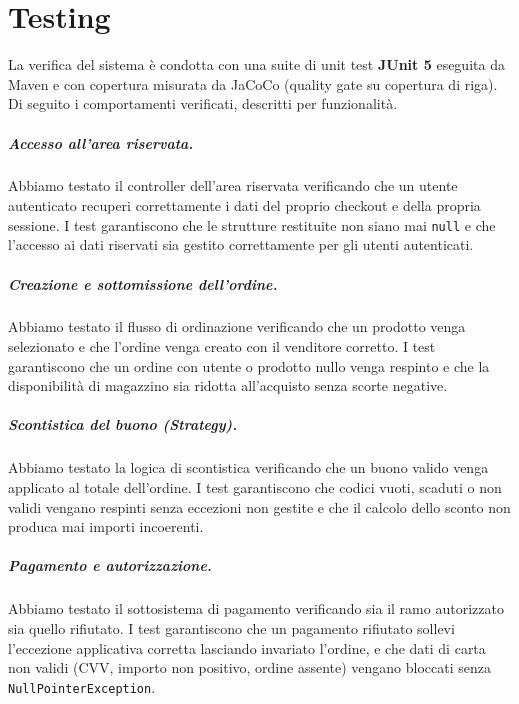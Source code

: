 \chapter{Testing}
\label{cap:testing}

La verifica del sistema è condotta con una suite di unit test \textbf{JUnit 5}
eseguita da Maven e con copertura misurata da JaCoCo (quality gate su copertura
di riga). Di seguito i comportamenti verificati, descritti per funzionalità.

\paragraph{Accesso all'area riservata.} Abbiamo testato il controller
dell'area riservata verificando che un utente autenticato recuperi
correttamente i dati del proprio checkout e della propria sessione. I test
garantiscono che le strutture restituite non siano mai \texttt{null} e che
l'accesso ai dati riservati sia gestito correttamente per gli utenti
autenticati.

\paragraph{Creazione e sottomissione dell'ordine.} Abbiamo testato il flusso
di ordinazione verificando che un prodotto venga selezionato e che l'ordine
venga creato con il venditore corretto. I test garantiscono che un ordine con
utente o prodotto nullo venga respinto e che la disponibilità di magazzino sia
ridotta all'acquisto senza scorte negative.

\paragraph{Scontistica del buono (Strategy).} Abbiamo testato la logica di
scontistica verificando che un buono valido venga applicato al totale
dell'ordine. I test garantiscono che codici vuoti, scaduti o non validi
vengano respinti senza eccezioni non gestite e che il calcolo dello sconto non
produca mai importi incoerenti.

\paragraph{Pagamento e autorizzazione.} Abbiamo testato il sottosistema di
pagamento verificando sia il ramo autorizzato sia quello rifiutato. I test
garantiscono che un pagamento rifiutato sollevi l'eccezione applicativa
corretta lasciando invariato l'ordine, e che dati di carta non validi (CVV,
importo non positivo, ordine assente) vengano bloccati senza
\texttt{NullPointerException}.

